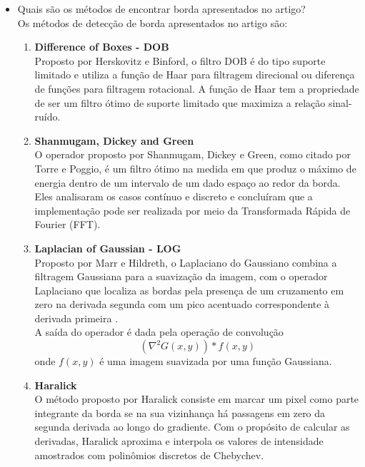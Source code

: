 \documentclass[12pt]{article}
\begin{document}
\begin{itemize}
\begin{itemize}
\item Quais são os métodos de encontrar borda apresentados no artigo?
\\Os métodos de detecção de borda apresentados no artigo são:
\begin{enumerate}[label*=\arabic*.]
    \item \textbf{Difference of Boxes - DOB}\\
    Proposto por Herskovitz e Binford, o filtro DOB é do tipo suporte limitado e utiliza a função de Haar para filtragem direcional
    ou diferença de funções para filtragem rotacional.
    A função de Haar tem a propriedade de ser um filtro ótimo de suporte limitado que maximiza a relação sinal-ruído.
    
    \item \textbf{Shanmugam, Dickey and Green}\\
    O operador proposto por Shanmugam, Dickey e Green, como citado por Torre e Poggio, é um filtro ótimo na medida em que produz o máximo de energia dentro de um intervalo de um dado espaço ao redor da borda. Eles analisaram os casos contínuo e discreto e concluíram que a implementação pode ser realizada por meio da Transformada Rápida de Fourier (FFT).
    
    \item \textbf{Laplacian of Gaussian - LOG}\\
    Proposto por Marr e Hildreth, o Laplaciano do Gaussiano combina a filtragem Gaussiana para a suavização da imagem, com o operador Laplaciano
    que localiza as bordas pela presença de um cruzamento em zero na derivada segunda com um pico acentuado correspondente à derivada primeira \cite{pedrini2008analise}.\\
    A saída do operador é dada pela operação de convolução
    \begin{equation} \label{eq:log}
        (\nabla^2 G(x, y)) * f(x, y)
    \end{equation}
    onde $f(x, y)$ é uma imagem suavizada por uma função Gaussiana.
    
    \item \textbf{Haralick}\\
    O método proposto por Haralick consiste em marcar um pixel como parte integrante da borda se na sua vizinhança há passagens em zero da segunda derivada ao longo do gradiente. Com o propósito de calcular as derivadas, Haralick aproxima e interpola os valores de intensidade amostrados com polinômios discretos de Chebychev.
    

\end{enumerate}
\end{itemize}
\end{itemize}
\end{document}
